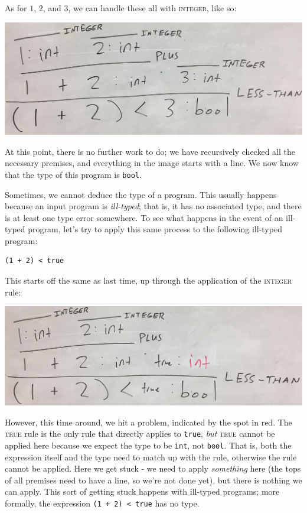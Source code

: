 \noindent
As for $1$, $2$, and $3$, we can handle these all with \textsc{integer}, like so:

\begin{center}
  \includegraphics[width=\linewidth]{images/basic_type_proof_3.png}
\end{center}

\noindent
At this point, there is no further work to do; we have recursively checked all the necessary premises, and everything in the image starts with a line.
We now know that the type of this program is \texttt{bool}.

Sometimes, we cannot deduce the type of a program.
This usually happens because an input program is \emph{ill-typed}; that is, it has no associated type, and there is at least one type error somewhere.
To see what happens in the event of an ill-typed program, let's try to apply this same process to the following ill-typed program:

\begin{verbatim}
(1 + 2) < true
\end{verbatim}

\noindent
This starts off the same as last time, up through the application of the \textsc{integer} rule:

\begin{center}
  \includegraphics[width=\linewidth]{images/basic_type_error.png}
\end{center}

\noindent
However, this time around, we hit a problem, indicated by the spot in red.
The \textsc{true} rule is the only rule that directly applies to \texttt{true}, \emph{but} \textsc{true} cannot be applied here because we expect the type to be \texttt{int}, not \texttt{bool}.
That is, both the expression itself and the type need to match up with the rule, otherwise the rule cannot be applied.
Here we get stuck - we need to apply \emph{something} here (the tops of all premises need to have a line, so we're not done yet), but there is nothing we can apply.
This sort of getting stuck happens with ill-typed programs; more formally, the expression \texttt{(1 + 2) < true} has no type.

